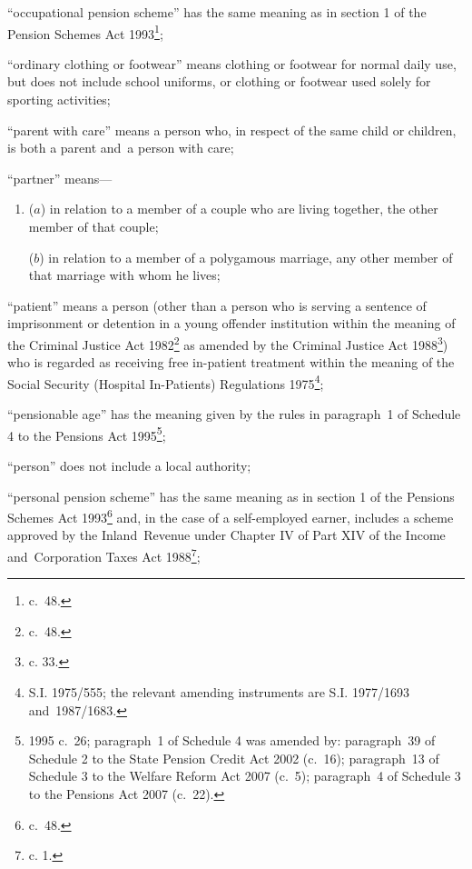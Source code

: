 \documentclass[12pt,a4paper]{article}
\begin{document}
\begin{enumerate}
“occupational pension scheme” has the same meaning as in 
section 1 of the Pension Schemes Act 1993\footnote{ c.~48.};  %

“ordinary clothing or footwear” means clothing or footwear for normal daily use, but does not include school uniforms, or clothing or footwear used solely for sporting activities;

“parent with care” means a person who, in respect of the same child or children, is both a parent and~a person with care;

“partner” means—
\begin{enumerate}\item[]
($a$)
in relation to a member of 
a couple  %
who are living together, the other member of that couple;

($b$)
in relation to a member of a polygamous marriage, any other member of that marriage with whom he lives;
\end{enumerate}

“patient” means a person (other than a person who is serving a sentence of imprisonment or detention in a young offender institution within the meaning of the Criminal Justice Act 1982\footnote{ c.~48.} as amended by the Criminal Justice Act 1988\footnote{ c. 33.}) who is regarded as receiving free in-patient treatment within the meaning of the Social Security (Hospital In-Patients) Regulations 1975\footnote{\frenchspacing S.I. 1975/555; the relevant amending instruments are S.I. 1977/1693 and~1987/1683.};

“pensionable age” has the meaning given by the rules in paragraph~1 of Schedule 4 to the Pensions Act 1995\footnote{1995 c.~26; paragraph~1 of Schedule 4 was amended by: paragraph~39 of Schedule 2 to the State Pension Credit Act 2002  (c.~16); paragraph~13 of Schedule 3 to the Welfare Reform Act 2007 (c.~5); paragraph~4 of Schedule 3 to the Pensions Act 2007 (c.~22).};

“person” does not include a local authority;

“personal pension scheme” has the same meaning as in 
section 1 of the Pensions Schemes Act 1993\footnote{ c.~48.}  %
and, in the case of a self-employed earner, includes a scheme approved by the Inland~Revenue under Chapter IV of Part XIV of the Income and~Corporation Taxes Act 1988\footnote{ c. 1.};


\end{enumerate}
\end{document}
